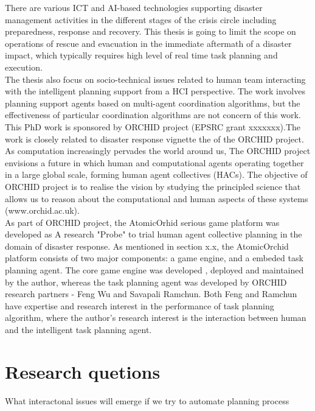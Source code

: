 There are various ICT and AI-based technologies supporting disaster management activities in the different stages of the crisis circle including preparedness, response and recovery. This thesis is going to limit the scope on operations of rescue and evacuation in the immediate aftermath of a disaster impact, which typically requires high level of real time task planning and execution.\\ 

The thesis also focus on socio-technical issues related to human team interacting with the intelligent planning support from a HCI perspective. The work involves planning support agents based on multi-agent coordination algorithms, but the effectiveness of particular coordination algorithms are not concern of this work.\\

This PhD work is sponsored by ORCHID project (EPSRC grant xxxxxxx).The work is closely related to disaster response vignette the of the ORCHID project. As computation increasingly pervades the world around us, The ORCHID project envisions a future in which human and computational agents operating together in a large global scale, forming human agent collectives (HACs). The objective of ORCHID project is to realise the vision by studying the principled science that allows us to reason about the computational and human aspects of these systems (www.orchid.ac.uk).\\ 

As part of ORCHID project, the AtomicOrhid serious game platform was developed as A research "Probe" to trial human agent collective planning in the domain of disaster response. As mentioned in section x.x,  the AtomicOrchid platform consists of two major components: a game engine, and a embeded task planning agent. The core game engine was developed , deployed and maintained by the author, whereas the task planning agent was developed by ORCHID research partners - Feng Wu and Savapali Ramchun. Both Feng and Ramchun have expertise and research interest in the performance of task planning algorithm, where the author's research interest is the interaction between human and the intelligent task planning agent. 

\section{Research quetions}

What interactonal issues will emerge if we try to automate planning process 


